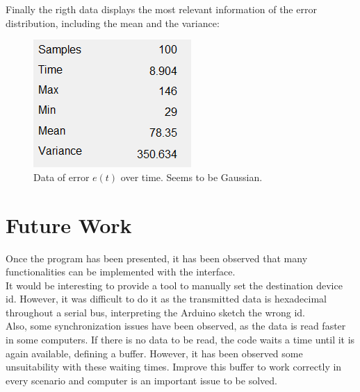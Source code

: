 \documentclass[a4paper, 21pt]{article} %
\begin{document}
Finally the rigth data displays the most relevant information of the error distribution, including the mean and the variance:
\begin{figure}[H]
\begin{center}
\includegraphics[scale=.9]{fig/e2.png}
\end{center}
\caption{Data of error $e(t)$ over time. Seems to be Gaussian.}
\end{figure}

\section{Future Work}
Once the program has been presented, it has been observed that many functionalities can be implemented with the interface.\\

It would be interesting to provide a tool to manually set the destination device id. However, it was difficult to do it as the transmitted data is hexadecimal throughout a serial bus, interpreting the Arduino sketch the wrong id.\\

Also, some synchronization issues have been observed, as the data is read faster in some computers. If there is no data to be read, the code waits a time until it is again available, defining a buffer. However, it has been observed some unsuitability with these waiting times. Improve this buffer to work correctly in every scenario and computer is an important issue to be solved.\\






\end{document}
